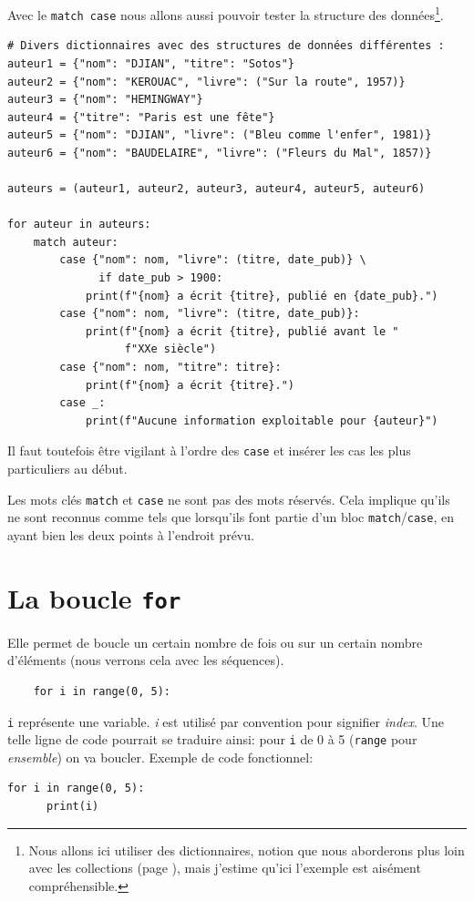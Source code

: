 \documentclass[a4paper,12pt]{book}
\begin{document}
Avec le \texttt{match case} nous allons aussi pouvoir tester la structure des données\footnote{Nous allons ici utiliser des dictionnaires, notion que nous aborderons plus loin avec les collections (page \pageref{collections}), mais j'estime qu'ici l'exemple est aisément compréhensible.}.
\begin{lstlisting}
# Divers dictionnaires avec des structures de données différentes :
auteur1 = {"nom": "DJIAN", "titre": "Sotos"}
auteur2 = {"nom": "KEROUAC", "livre": ("Sur la route", 1957)}
auteur3 = {"nom": "HEMINGWAY"}
auteur4 = {"titre": "Paris est une fête"}
auteur5 = {"nom": "DJIAN", "livre": ("Bleu comme l'enfer", 1981)}
auteur6 = {"nom": "BAUDELAIRE", "livre": ("Fleurs du Mal", 1857)}

auteurs = (auteur1, auteur2, auteur3, auteur4, auteur5, auteur6)

for auteur in auteurs:
    match auteur:
        case {"nom": nom, "livre": (titre, date_pub)} \
              if date_pub > 1900:
            print(f"{nom} a écrit {titre}, publié en {date_pub}.")
        case {"nom": nom, "livre": (titre, date_pub)}:
            print(f"{nom} a écrit {titre}, publié avant le "
                  f"XXe siècle")
        case {"nom": nom, "titre": titre}:
            print(f"{nom} a écrit {titre}.")
        case _:
            print(f"Aucune information exploitable pour {auteur}")
\end{lstlisting}
\medskip

Il faut toutefois être vigilant à l'ordre des \texttt{case} et insérer les cas les plus particuliers au début.
\medskip

Les mots clés \texttt{match} et \texttt{case} ne sont pas des mots réservés. Cela implique qu'ils ne sont reconnus comme tels que lorsqu'ils font partie d'un bloc \texttt{match}/\texttt{case}, en ayant bien les deux points à l'endroit prévu.
\medskip

\chapter{La boucle \texttt{for}}
Elle permet de boucle un certain nombre de fois ou sur un certain nombre d'éléments (nous verrons cela avec les séquences).
\medskip

\begin{verbatim}
    for i in range(0, 5):
\end{verbatim}
\medskip

\texttt{i} représente une variable. \textit{i} est utilisé par convention pour signifier \textit{index}. Une telle ligne de code pourrait se traduire ainsi: pour \texttt{i} de 0 à 5 (\texttt{range} pour \textit{ensemble}) on va boucler. Exemple de code fonctionnel:
\begin{lstlisting}[caption=Un premier exemple avec une boucle \texttt{for}]
  for i in range(0, 5):
  	  print(i)
\end{lstlisting}
\medskip
\end{document}

